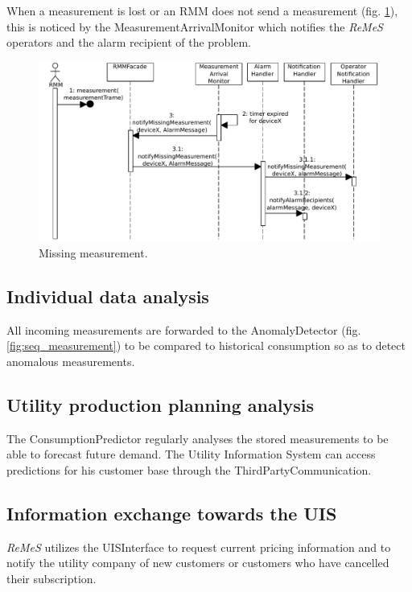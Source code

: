 \documentclass[a4paper,10pt]{article}
\newcommand{\rem}{\emph{ReMeS}\xspace}
\begin{document}
When a measurement is lost or an RMM does not send a measurement (fig. \ref{fig:seq_missed}), this is noticed by the MeasurementArrivalMonitor which notifies the \rem operators and the alarm recipient of the problem.

\begin{figure}[!htp]
    \centering
    \includegraphics[width=\textwidth]{Missing_measurement}
    \caption{Missing measurement.}
    \label{fig:seq_missed}
\end{figure}

\subsection{Individual data analysis}
All incoming measurements are forwarded to the AnomalyDetector (fig. \ref{fig:seq_measurement}) to be compared to historical consumption so as to detect anomalous measurements.

\subsection{Utility production planning analysis}
The ConsumptionPredictor regularly analyses the stored measurements to be able to forecast future demand. The Utility Information System can access predictions for his customer base through the ThirdPartyCommunication.

\subsection{Information exchange towards the UIS}
\rem utilizes the UISInterface to request current pricing information and to notify the utility company of new customers or customers who have cancelled their subscription.
\end{document}
